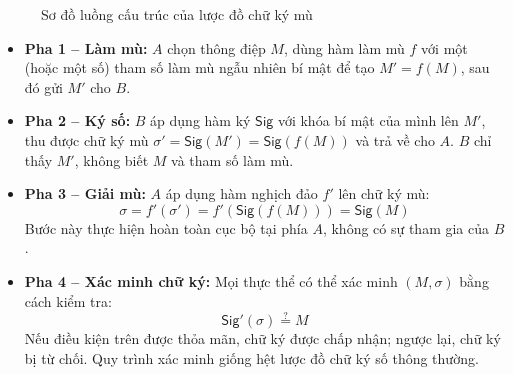 \begin{figure}[htbp]
    \centering
    \caption{Sơ đồ luồng cấu trúc của lược đồ chữ ký mù}
    \label{fig:luong-chu-ky-mu}
\end{figure}

\begin{itemize}
    \item \textbf{Pha 1 -- Làm mù:} $A$ chọn thông điệp $M$, dùng hàm làm mù $f$ với một (hoặc một số) tham số làm mù ngẫu nhiên bí mật để tạo $M' = f(M)$, sau đó gửi $M'$ cho $B$.

    \item \textbf{Pha 2 -- Ký số:} $B$ áp dụng hàm ký $\textsf{Sig}$ với khóa bí mật của mình lên $M'$, thu được chữ ký mù $\sigma' = \textsf{Sig}(M') = \textsf{Sig}(f(M))$ và trả về cho $A$. $B$ chỉ thấy $M'$, không biết $M$ và tham số làm mù.

    \item \textbf{Pha 3 -- Giải mù:} $A$ áp dụng hàm nghịch đảo $f'$ lên chữ ký mù:
    \begin{equation}
        \sigma = f'(\sigma') = f'(\textsf{Sig}(f(M))) = \textsf{Sig}(M)
        \label{eq:unblinding}
    \end{equation}
    Bước này thực hiện hoàn toàn cục bộ tại phía $A$, không có sự tham gia của $B$.

    \item \textbf{Pha 4 -- Xác minh chữ ký:} Mọi thực thể có thể xác minh $(M, \sigma)$ bằng cách kiểm tra:
    \begin{equation}
        \textsf{Sig}'(\sigma) \overset{?}{=} M
        \label{eq:blind-verify}
    \end{equation}
    Nếu điều kiện trên được thỏa mãn, chữ ký được chấp nhận; ngược lại, chữ ký bị từ chối. Quy trình xác minh giống hệt lược đồ chữ ký số thông thường.
\end{itemize}

